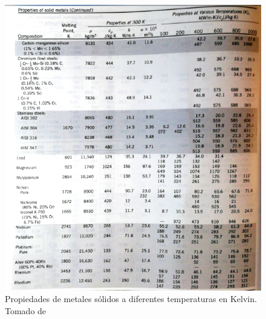 \documentclass[12pt,letterpaper]{article}     %
\begin{document}
\begin{figure}[H]
\centering
\includegraphics[width=1.2\textwidth]{Imagines/propiedadesmet2.png}
\caption{Propiedades de metales sólidos a diferentes temperaturas en Kelvin. Tomado de \cite[p\ 1010]{yunus}}
\label{fig:propiedadesmetales2}
\end{figure}



\newpage


\newpage


\newpage


\newpage

\end{document}
